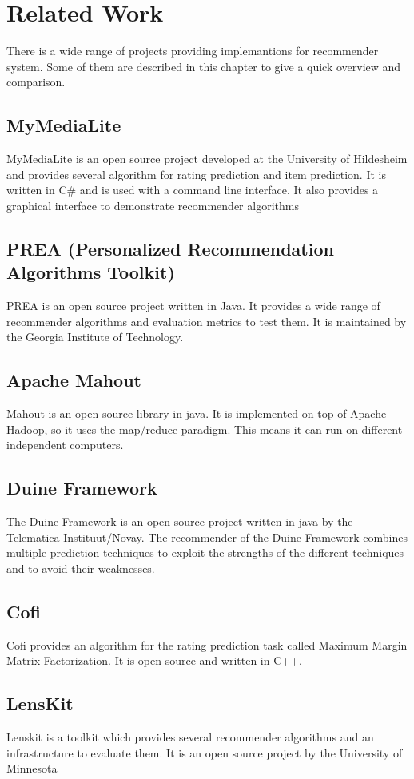 
\chapter{Related Work}

There is a wide range of projects providing implemantions for recommender
system. Some of them are described in this chapter to give a quick
overview and comparison.


\section{MyMediaLite}

MyMediaLite\cite{key-1} is an open source project developed at the
University of Hildesheim and provides several algorithm for rating
prediction and item prediction. It is written in C\# and is used with
a command line interface. It also provides a graphical interface to
demonstrate recommender algorithms


\section{PREA (Personalized Recommendation Algorithms Toolkit)}

PREA\cite{key-2} is an open source project written in Java. It provides
a wide range of recommender algorithms and evaluation metrics to test
them. It is maintained by the Georgia Institute of Technology.


\section{Apache Mahout}

Mahout\cite{key-6} is an open source library in java. It is implemented
on top of Apache Hadoop, so it uses the map/reduce paradigm. This
means it can run on different independent computers.


\section{Duine Framework}

The Duine Framework \cite{key-7} is an open source project written
in java by the Telematica Instituut/Novay. The recommender of the
Duine Framework combines multiple prediction techniques to exploit
the strengths of the different techniques and to avoid their weaknesses.


\section{Cofi}

Cofi \cite{key-8}provides an algorithm for the rating prediction
task called Maximum Margin Matrix Factorization. It is open source
and written in C++.


\section{LensKit}

Lenskit \cite{key-9} is a toolkit which provides several recommender
algorithms and an infrastructure to evaluate them. It is an open source
project by the University of Minnesota


